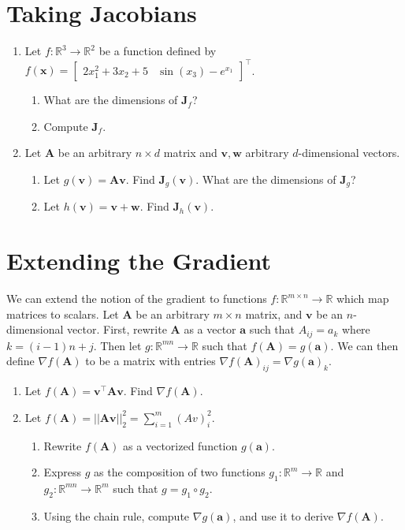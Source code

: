 \documentclass{article}
\begin{document}
\section{Taking Jacobians}
\begin{enumerate}[label=\arabic*.]
\item Let $f: \mathbb{R}^3 \rightarrow \mathbb{R}^2$ be a function defined by $f(\mathbf{x}) = \begin{bmatrix} 2x_1^2 + 3x_2 + 5 & \sin(x_3) - e^{x_1} \end{bmatrix}^\top$.
	\begin{enumerate}[label=(\alph*)]
	\item What are the dimensions of $\mathbf{J}_f$?
	\item Compute $\mathbf{J}_f$.
	\end{enumerate}
\item Let $\mathbf{A}$ be an arbitrary $n\times d$ matrix and $\mathbf{v}, \mathbf{w}$ arbitrary $d$-dimensional vectors.
	\begin{enumerate}[label=(\alph*)]
	\item Let $g(\mathbf{v}) = \mathbf{Av}$. Find $\mathbf{J}_{g}(\mathbf{v})$. What are the dimensions of $\mathbf{J}_g$?
	\item Let $h(\mathbf{v}) = \mathbf{v + w}$. Find $\mathbf{J}_{h}(\mathbf{v})$.
	\end{enumerate}
\end{enumerate}

\section{Extending the Gradient}
We can extend the notion of the gradient to functions $f: \mathbb{R}^{m \times n} \rightarrow \mathbb{R}$ which map matrices to scalars. Let $\mathbf{A}$ be an arbitrary $m \times n$ matrix, and $\mathbf{v}$ be an $n$-dimensional vector. First, rewrite $\mathbf{A}$ as a vector $\mathbf{a}$ such that $A_{ij} = a_k$ where $k = (i-1)n + j$. Then let $g: \mathbb{R}^{mn} \rightarrow \mathbb{R}$ such that $f(\mathbf{A}) = g(\mathbf{a})$. We can then define $\nabla f(\mathbf{A})$ to be a matrix with entries $\nabla f(\mathbf{A})_{ij} = \nabla g(\mathbf{a})_k$.
\begin{enumerate}[label=\arabic*.]
\item Let $f(\mathbf{A}) = \mathbf{v^\top Av}$. Find $\nabla f(\mathbf{A})$.
\item Let $f(\mathbf{A}) = ||\mathbf{Av}||_2^2 = \sum_{i=1}^m (Av)_i^2$.
	\begin{enumerate}[label=\alph*.]
	\item Rewrite $f(\mathbf{A})$ as a vectorized function $g(\mathbf{a})$.
	\item Express $g$ as the composition of two functions $g_1: \mathbb{R}^m \rightarrow \mathbb{R}$ and $g_2: \mathbb{R}^{mn} \rightarrow \mathbb{R}^m$ such that $g = g_1 \circ g_2$.
	\item Using the chain rule, compute $\nabla g(\mathbf{a})$, and use it to derive $\nabla f(\mathbf{A})$.
	\end{enumerate}
\end{enumerate}
\end{document}
